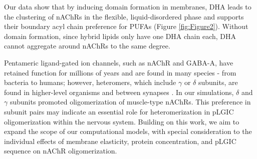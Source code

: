 \documentclass[final,3p,times,twocolumn]{elsarticle}
\begin{document}



Our data show that by inducing domain formation in membranes, DHA leads to the clustering of nAChRs in the flexible, liquid-disordered phase and supports their boundary acyl chain preference for PUFAs (Figure \ref{fig:Figure2}). Without domain formation, since hybrid lipids only have one DHA chain each, DHA cannot aggregate around nAChRs to the same degree. 


Pentameric ligand-gated ion channels, such as nAChR and GABA-A, have retained function for millions of years and are found in many species - from bacteria to humans; however, heteromers, which include $\gamma$ or $\delta$ subunits, are found in higher-level organisms and between synapses \cite{Jaiteh2016}. In our simulations, $\delta$ and $\gamma$ subunits promoted oligomerization of muscle-type nAChRs. This preference in subunit pairs may indicate an essential role for heteromerization in pLGIC oligomerization within the nervous system. Building on this work, we aim to expand the scope of our computational models, with special consideration to the individual effects of membrane elasticity, protein concentration, and pLGIC sequence on nAChR oligomerization.  























\end{document}
